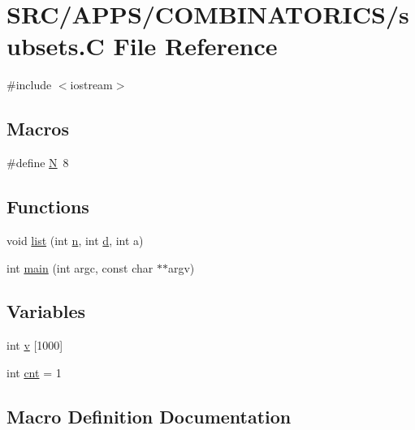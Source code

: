 \hypertarget{subsets_8_c}{}\section{S\+R\+C/\+A\+P\+P\+S/\+C\+O\+M\+B\+I\+N\+A\+T\+O\+R\+I\+C\+S/subsets.C File Reference}
\label{subsets_8_c}
{\ttfamily \#include $<$iostream$>$}\newline
\subsection*{Macros}
\begin{DoxyCompactItemize}
\item 
\#define \mbox{\hyperlink{subsets_8_c_a0240ac851181b84ac374872dc5434ee4}{N}}~8
\end{DoxyCompactItemize}
\subsection*{Functions}
\begin{DoxyCompactItemize}
\item 
void \mbox{\hyperlink{subsets_8_c_aed8fe9fe9c2153603c10f9e2ec007701}{list}} (int \mbox{\hyperlink{simeon_8_c_a7f2cd26777ce0ff3fdaf8d02aacbddfb}{n}}, int \mbox{\hyperlink{simeon_8_c_a4339ca06fa882e69473d37bd6d7917d1}{d}}, int a)
\item 
int \mbox{\hyperlink{subsets_8_c_a217dbf8b442f20279ea00b898af96f52}{main}} (int argc, const char $\ast$$\ast$argv)
\end{DoxyCompactItemize}
\subsection*{Variables}
\begin{DoxyCompactItemize}
\item 
int \mbox{\hyperlink{subsets_8_c_a507f6ffe173a9be4a3f93aefae2f4b46}{v}} \mbox{[}1000\mbox{]}
\item 
int \mbox{\hyperlink{subsets_8_c_a9cfbb269728dc4185236d28be58d9eab}{cnt}} = 1
\end{DoxyCompactItemize}


\subsection{Macro Definition Documentation}
\mbox{\label{subsets_8_c_a0240ac851181b84ac374872dc5434ee4}} 
